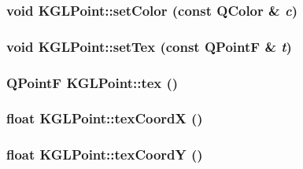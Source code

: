 \hypertarget{class_k_g_l_point_b03b0a3565b23a9dc914e877ccde23e9}{
\subsubsection[{setColor}]{\setlength{\rightskip}{0pt plus 5cm}void KGLPoint::setColor (const QColor \& {\em c})}}
\label{class_k_g_l_point_b03b0a3565b23a9dc914e877ccde23e9}


\hypertarget{class_k_g_l_point_2670bdba8e0274cacd1034fa048dbf64}{
\subsubsection[{setTex}]{\setlength{\rightskip}{0pt plus 5cm}void KGLPoint::setTex (const QPointF \& {\em t})}}
\label{class_k_g_l_point_2670bdba8e0274cacd1034fa048dbf64}


\hypertarget{class_k_g_l_point_75e4837c809e80d80d93df8009a79b39}{
\subsubsection[{tex}]{\setlength{\rightskip}{0pt plus 5cm}QPointF KGLPoint::tex ()}}
\label{class_k_g_l_point_75e4837c809e80d80d93df8009a79b39}


\hypertarget{class_k_g_l_point_997327431417659d02cae5f3c0c91297}{
\subsubsection[{texCoordX}]{\setlength{\rightskip}{0pt plus 5cm}float KGLPoint::texCoordX ()}}
\label{class_k_g_l_point_997327431417659d02cae5f3c0c91297}


\hypertarget{class_k_g_l_point_b9202127decfa0165dc49903a28e6ae9}{
\subsubsection[{texCoordY}]{\setlength{\rightskip}{0pt plus 5cm}float KGLPoint::texCoordY ()}}
\label{class_k_g_l_point_b9202127decfa0165dc49903a28e6ae9}


